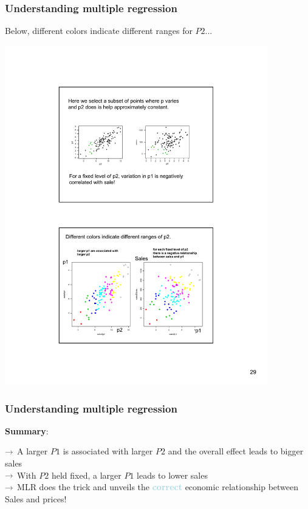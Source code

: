 \documentclass{beamer}
\newcommand{\bo}[1]{\textcolor{burntorange}{#1}}
\newcommand{\lb}[1]{\textcolor{lightblue}{#1}}
\newcommand{\dg}[1]{\textcolor{darkgray}{#1}}
\newcommand{\sk}{\vspace{.5cm}}
\begin{document}
\begin{frame}
\frametitle{Understanding multiple regression}

\sk
Below, different colors indicate different ranges for $P2$...

\vspace{2mm}
\hspace*{-4mm}\includegraphics[width=4.5in]{figures/Sales4}
\end{frame}
\begin{frame}
\frametitle{Understanding multiple regression}

\bo{\bf Summary}: \\ \sk\sk

$\dg{\rightarrow}$ A larger $P1$ is associated with larger $P2$ and the overall effect leads to bigger sales \\ \sk
$\dg{\rightarrow}$ With $P2$ held fixed, a larger $P1$ leads to lower sales \\ \sk
$\dg{\rightarrow}$ MLR does the trick and unveils the \lb{\bf correct} economic relationship between Sales and prices! \\ \sk
\end{frame}
\end{document}
